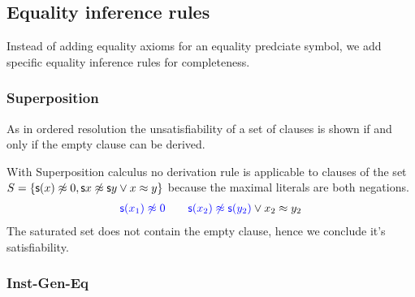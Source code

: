 
\subsection{Equality inference rules}

Instead of adding equality axioms for an equality predciate symbol,
we add specific equality inference rules for completeness.


\subsubsection{Superposition}\label{sec:superposition}

As in ordered resolution the unsatisfiability of a set of clauses is shown
if and only if the empty clause can be derived. 




\begin{example} With Superposition calculus no derivation rule is applicable
	to clauses of the set $S = \{ \mathsf{s}(x)\not\approx 0, \mathsf{s}{x}\not\approx\mathsf{s}{y} \lor x\approx y  \}$
	because the maximal literals are both negations.
	\begin{align*}
	{\colN \msucc(x_1) \mNE 0}\qquad{\colN \msucc(x_2) \mNE \msucc(y_2)} \lor x_2\mEQ y_2
	\end{align*}
	The saturated set does not contain the empty clause, hence we conclude it's satisfiability.
\end{example}

\subsubsection{Inst-Gen-Eq}\label{sec:inst:gen:eq}


